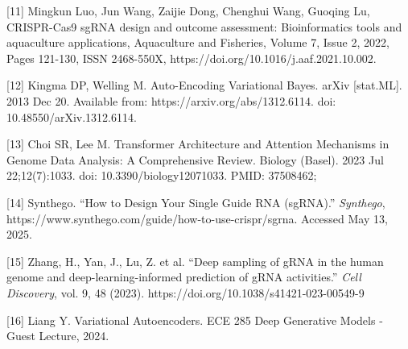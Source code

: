 \documentclass{article}
\begin{document}
\label{Reference 11} [11] Mingkun Luo, Jun Wang, Zaijie Dong, Chenghui Wang, Guoqing Lu, CRISPR-Cas9 sgRNA design and outcome assessment: Bioinformatics tools and aquaculture applications, Aquaculture and Fisheries, Volume 7, Issue 2, 2022, Pages 121-130, ISSN 2468-550X, https://doi.org/10.1016/j.aaf.2021.10.002.

\label{Reference 12} [12] Kingma DP, Welling M. Auto-Encoding Variational Bayes. arXiv [stat.ML]. 2013 Dec 20. Available from: https://arxiv.org/abs/1312.6114. doi: 10.48550/arXiv.1312.6114.

\label{Reference 13} [13] Choi SR, Lee M. Transformer Architecture and Attention Mechanisms in Genome Data Analysis: A Comprehensive Review. Biology (Basel). 2023 Jul 22;12(7):1033. doi: 10.3390/biology12071033. PMID: 37508462;

\label{Reference 14} [14] Synthego. “How to Design Your Single Guide RNA (sgRNA).” \textit{Synthego}, https://www.synthego.com/guide/how-to-use-crispr/sgrna. Accessed May 13, 2025.

\label{Reference 15} [15] Zhang, H., Yan, J., Lu, Z. et al. “Deep sampling of gRNA in the human genome and deep-learning-informed prediction of gRNA activities.” \textit{Cell Discovery}, vol. 9, 48 (2023). https://doi.org/10.1038/s41421-023-00549-9

\label{Reference 16} [16] Liang Y. Variational Autoencoders. ECE 285 Deep Generative Models - Guest Lecture, 2024.
\end{document}
